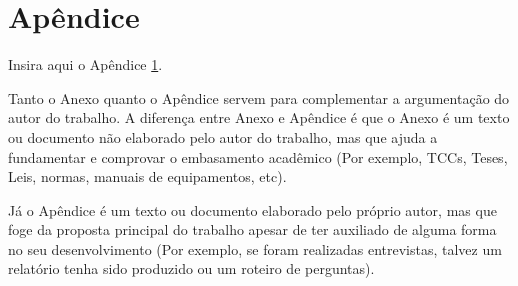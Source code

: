 \documentclass[conference,harvard,brazil,english]{icttcc}
\begin{document}
\vspace{-0.5cm}
\Authorbiography

\newpage

\onecolumn

\appendix

\section{Apêndice} \label{ape:apendiceA}

Insira aqui o Apêndice \ref{ape:apendiceA}.

Tanto o Anexo quanto o Apêndice servem para complementar a argumentação do autor do trabalho. A diferença entre Anexo e Apêndice é que o Anexo é um texto ou documento não elaborado pelo autor do trabalho, mas que ajuda a fundamentar e comprovar o embasamento acadêmico (Por exemplo, TCCs, Teses, Leis, normas, manuais de equipamentos, etc).

Já o Apêndice é um texto ou documento elaborado pelo próprio autor, mas que foge da proposta principal do trabalho apesar de ter auxiliado de alguma forma no seu desenvolvimento (Por exemplo, se foram realizadas entrevistas, talvez um relatório tenha sido produzido ou um roteiro de perguntas).
\end{document}
